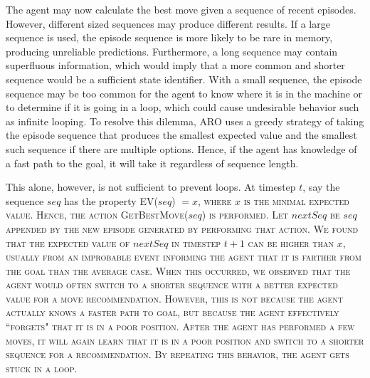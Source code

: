 \documentclass[letterpaper]{article} %
\begin{document}
The agent may now calculate the best move given a sequence of recent
episodes. However, different sized sequences may produce different
results. If a large sequence is used, the episode sequence is more
likely to be rare in memory, producing unreliable
predictions. Furthermore, a long sequence may contain superfluous
information, which would imply that a more common and shorter sequence
would be a sufficient state identifier. With a small sequence, the
episode sequence may be too common for the agent to know where it is
in the machine or to determine if it is going in a loop, which could
cause undesirable behavior such as infinite looping. To resolve this
dilemma, ARO uses a greedy strategy of taking the episode sequence
that produces the smallest expected value and the smallest such sequence
if there are multiple options. Hence, if the agent has
knowledge of a fast path to the goal, it will take it regardless of
sequence length.


This alone, however, is not sufficient to prevent loops. At timestep
$t$, say the sequence $seq$ has the property \scshape
EV\normalfont($seq$) $ = x$, where $x$ is the minimal expected
value. Hence, the action \scshape GetBestMove\normalfont($seq$) is
performed. Let $nextSeq$ be $seq$ appended by the new episode
generated by performing that action. We found that the expected value
of $nextSeq$ in timestep $t+ 1$ can be higher than $x$, usually from
an improbable event informing the agent that it is farther from the
goal than the average case. When this occurred, we observed that the
agent would often switch to a shorter sequence with a better expected
value for a move recommendation. However, this is not because the
agent actually knows a faster path to goal, but because the agent
effectively ``forgets" that it is in a poor position. After the agent
has performed a few moves, it will again learn that it is in a poor
position and switch to a shorter sequence for a recommendation. By
repeating this behavior, the agent gets stuck in a loop.
\end{document}
